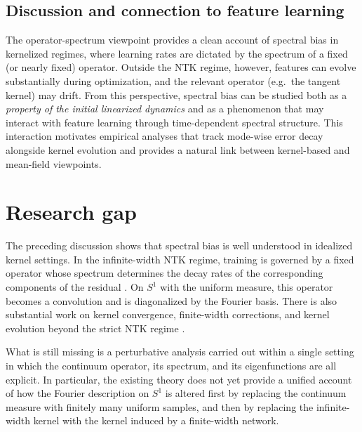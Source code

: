 \subsection{Discussion and connection to feature learning}

The operator-spectrum viewpoint provides a clean account of spectral bias in
kernelized regimes, where learning rates are dictated by the spectrum of a fixed
(or nearly fixed) operator. Outside the NTK regime, however, features can evolve
substantially during optimization, and the relevant operator (e.g.\ the tangent
kernel) may drift. From this perspective, spectral bias can be studied both as a
\emph{property of the initial linearized dynamics} and as a phenomenon that may
interact with feature learning through time-dependent spectral structure. This
interaction motivates empirical analyses that track mode-wise error decay
alongside kernel evolution and provides a natural link between kernel-based and
mean-field viewpoints.

\section{Research gap}\label{sec:research-gap}

The preceding discussion shows that spectral bias is well understood in idealized kernel
settings. In the infinite-width NTK regime, training is governed by a fixed operator whose
spectrum determines the decay rates of the corresponding components of the residual
\citep{jacot2018ntk, rahaman2019spectralbiasneuralnetworks, cao2020understandingspectralbiasdeep}.
On \(S^1\) with the uniform measure, this operator becomes a convolution and is diagonalized
by the Fourier basis. There is also substantial work on kernel convergence, finite-width
corrections, and kernel evolution beyond the strict NTK regime
\citep{golikov2022neuraltangentkernelsurvey, bordelon2023dynamicsfinitewidthkernel,
	vyas2022limitationsntkunderstandinggeneralization}.

What is still missing is a perturbative analysis carried out within a single setting in which
the continuum operator, its spectrum, and its eigenfunctions are all explicit. In
particular, the existing theory does not yet provide a unified account of how the Fourier
description on \(S^1\) is altered first by replacing the continuum measure with finitely many
uniform samples, and then by replacing the infinite-width kernel with the kernel induced by
a finite-width network.


